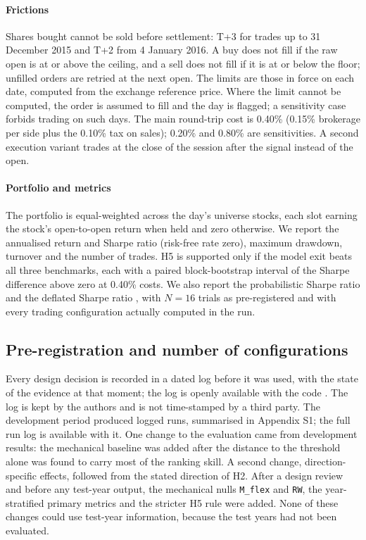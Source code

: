 \paragraph{Frictions} Shares bought cannot be sold before settlement: T+3 for trades up to
31 December 2015 and T+2 from 4 January 2016. A buy does not fill if the raw open is at or above the
ceiling, and a sell does not fill if it is at or below the floor; unfilled orders are retried at the
next open. The limits are those in force on each date, computed from the exchange reference price.
Where the limit cannot be computed, the order is assumed to fill and the day is flagged; a
sensitivity case forbids trading on such days. The main round-trip cost is 0.40\% (0.15\% brokerage
per side plus the 0.10\% tax on sales); 0.20\% and 0.80\% are sensitivities. A second execution
variant trades at the close of the session after the signal instead of the open.

\paragraph{Portfolio and metrics} The portfolio is equal-weighted across the day's universe stocks,
each slot earning the stock's open-to-open return when held and zero otherwise. We report the
annualised return and Sharpe ratio (risk-free rate zero), maximum drawdown, turnover and the
number of trades. H5 is supported only if the model exit beats all three benchmarks, each with a
paired block-bootstrap interval of the Sharpe difference above zero at 0.40\% costs. We also report
the probabilistic Sharpe ratio \citep{BaileyLopezdePrado2012} and the deflated Sharpe ratio
\citep{BaileyLopezdePrado2014}, with $N=16$ trials as pre-registered and with every trading
configuration actually computed in the run.

\subsection{Pre-registration and number of configurations}\label{sec:prereg}

Every design decision is recorded in a dated log before it was used, with the state of the
evidence at that moment; the log is openly available with the code \citep{LuuPhamNgo2026Code}. The log is kept by the authors and is not time-stamped by a third party. The development
period produced  logged runs, summarised in Appendix S1; the full run log is available with it. One
change to the evaluation came from development results: the mechanical baseline was added after
the distance to the threshold alone was found to carry most of the ranking skill. A second change,
direction-specific effects, followed from the stated direction of H2. After a design review and
before any test-year output, the mechanical nulls \texttt{M\_flex} and \texttt{RW}, the year-stratified primary
metrics and the stricter H5 rule were added. None of these changes could use test-year
information, because the test years had not been evaluated.

